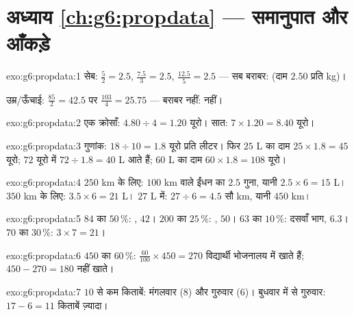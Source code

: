 \section*{अध्याय \ref{ch:g6:propdata} --- समानुपात और आँकड़े}

\begin{solution}{exo:g6:propdata:1}
सेब:  $\frac52 = 2.5$, $\frac{7.5}{3} = 2.5$,
$\frac{12.5}{5} = 2.5$ --- सब बराबर:  (दाम
$2.50$ प्रति kg)।

उम्र/ऊँचाई: $\frac{85}{2} = 42.5$ पर $\frac{103}{4} = 25.75$ ---
बराबर नहीं:  नहीं।
\end{solution}

\begin{solution}{exo:g6:propdata:2}
एक क्रोसाँ: $4.80 \div 4 = 1.20$ यूरो। सात:
$7 \times 1.20 = 8.40$ यूरो।
\end{solution}

\begin{solution}{exo:g6:propdata:3}
गुणांक: $18 \div 10 = 1.8$ यूरो प्रति लीटर। फिर
$25$ L का दाम $25 \times 1.8 = 45$ यूरो; $72$ यूरो में
$72 \div 1.8 = 40$ L आते हैं; $60$ L का दाम $60 \times 1.8 = 108$ यूरो।
\end{solution}

\begin{solution}{exo:g6:propdata:4}
$250$ km के लिए: $100$ km वाले ईंधन का $2.5$ गुना, यानी
$2.5 \times 6 = 15$ L। $350$ km के लिए: $3.5 \times 6 = 21$ L।
$27$ L में: $27 \div 6 = 4.5$ सौ km, यानी $450$ km।
\end{solution}

\begin{solution}{exo:g6:propdata:5}
$84$ का $50\,\%$: , $42$। \quad
$200$ का $25\,\%$: , $50$। \quad
$63$ का $10\,\%$: दसवाँ भाग, $6.3$। \quad
$70$ का $30\,\%$: $3 \times 7 = 21$।
\end{solution}

\begin{solution}{exo:g6:propdata:6}
$450$ का $60\,\%$: $\frac{60}{100} \times 450 = 270$ विद्यार्थी
भोजनालय में खाते हैं; $450 - 270 = 180$ नहीं खाते।
\end{solution}

\begin{solution}{exo:g6:propdata:7}
$10$ से कम किताबें: मंगलवार ($8$) और गुरुवार ($6$)। बुधवार में
से गुरुवार: $17 - 6 = 11$ किताबें ज़्यादा।
\end{solution}


